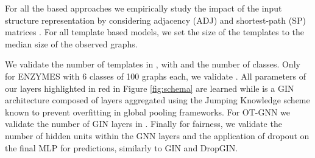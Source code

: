\documentclass{article}
\begin{document}
For all the  based approaches we empirically study the impact of the
input structure representation by considering adjacency (ADJ) and
shortest-path (SP) matrices . For all template based models, we set the size of
the templates to the median size of the observed graphs. 

We validate the number of templates  in , with  and  the number of classes. Only for ENZYMES with 6
classes of 100 graphs each, we validate .
All parameters of our  layers highlighted in \textcolor{myred}{red} in Figure
\ref{fig:schema} are learned while  is a GIN architecture
\cite{xu2018powerful} composed of  layers aggregated using the Jumping Knowledge scheme \cite{xu2018representation}
known to prevent overfitting in global pooling frameworks. For OT-GNN 
we validate the number of GIN layers in . Finally for fairness, we validate the number
of hidden units within the
GNN layers and the application of dropout on the final MLP for predictions,
similarly to GIN and DropGIN.
\end{document}
